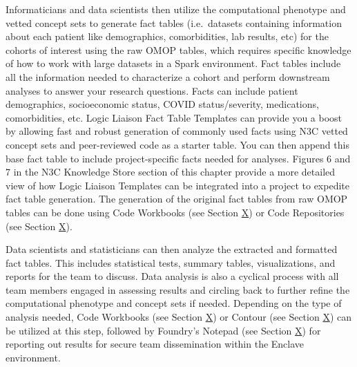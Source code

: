 \documentclass[
  letterpaper,
  DIV=11,
  numbers=noendperiod]{scrreprt}
\begin{document}
Informaticians and data scientists then utilize the computational
phenotype and vetted concept sets to generate fact tables (i.e.~datasets
containing information about each patient like demographics,
comorbidities, lab results, etc) for the cohorts of interest using the
raw OMOP tables, which requires specific knowledge of how to work with
large datasets in a Spark environment. Fact tables include all the
information needed to characterize a cohort and perform downstream
analyses to answer your research questions. Facts can include patient
demographics, socioeconomic status, COVID status/severity, medications,
comorbidities, etc. Logic Liaison Fact Table Templates can provide you a
boost by allowing fast and robust generation of commonly used facts
using N3C vetted concept sets and peer-reviewed code as a starter table.
You can then append this base fact table to include project-specific
facts needed for analyses. Figures 6 and 7 in the N3C Knowledge Store
section of this chapter provide a more detailed view of how Logic
Liaison Templates can be integrated into a project to expedite fact
table generation. The generation of the original fact tables from raw
OMOP tables can be done using Code Workbooks (see Section
\protect\hyperlink{Code-Workbooks}{X}) or Code Repositories (see Section
\protect\hyperlink{Code-Repositories}{X}).

Data scientists and statisticians can then analyze the extracted and
formatted fact tables. This includes statistical tests, summary tables,
visualizations, and reports for the team to discuss. Data analysis is
also a cyclical process with all team members engaged in assessing
results and circling back to further refine the computational phenotype
and concept sets if needed. Depending on the type of analysis needed,
Code Workbooks (see Section \protect\hyperlink{Code-Workbooks}{X}) or
Contour (see Section \protect\hyperlink{Contour}{X}) can be utilized at
this step, followed by Foundry's Notepad (see Section
\protect\hyperlink{Notepad}{X}) for reporting out results for secure
team dissemination within the Enclave environment.
\end{document}
